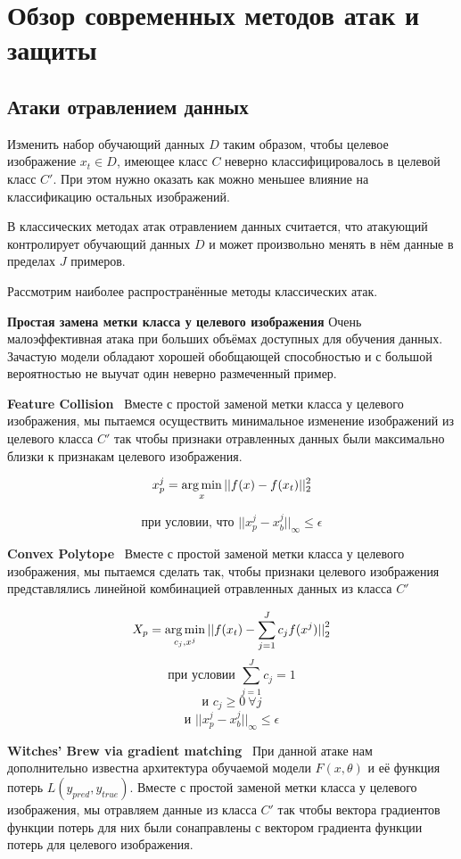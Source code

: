 \section*{Обзор современных методов атак и защиты}
\subsection*{Атаки отравлением данных}
Изменить набор обучающий данных $D$ таким образом, чтобы целевое изображение $x_t \in D$, имеющее класс $C$ неверно классифицировалось в целевой класс $C'$.
При этом нужно оказать как можно меньшее влияние на классификацию остальных изображений.

В классических методах атак отравлением данных считается, что атакующий контролирует обучающий данных $D$ и может произвольно менять в нём данные в пределах $J$ примеров.

Рассмотрим наиболее распространённые методы классических атак.

\textbf{Простая замена метки класса у целевого изображения}
Очень малоэффективная атака при больших объёмах доступных для обучения данных. Зачастую модели обладают хорошей обобщающей способностью и с большой вероятностью не выучат один неверно размеченный пример.

\textbf{Feature Collision}~\cite{schwarzschild_just_2021}
Вместе с простой заменой метки класса у целевого изображения, мы пытаемся осуществить минимальное изменение изображений из целевого класса $C'$ так чтобы признаки отравленных данных были максимально близки к признакам целевого изображения.

$$x^{j}_{p} = \operatorname*{arg\,min}_x ||f(x)-f(x_t)||_{2}^{2}$$

$$\text{при условии, что~} ||x_{p}^{j} - x_{b}^{j}||_{\infty} \leq \epsilon$$


\textbf{Convex Polytope}~\cite{schwarzschild_just_2021}
Вместе с простой заменой метки класса у целевого изображения, мы пытаемся сделать так, чтобы признаки целевого изображения представлялись линейной комбинацией отравленных данных из класса $C'$

$$X_p = \operatorname*{arg\,min}_{c_j, x^j} ||f(x_t) - \sum_{j=1}^{J} c_j f(x^j){||}_{2}^{2}$$
$$\text{при условии~} \sum_{j=1}^{J} c_j = 1$$
$$\text{и~} c_j \geq 0~\forall j$$
$$\text{и~} ||x_{p}^{j} - x_{b}^{j}||_{\infty} \leq \epsilon$$


\textbf{Witches' Brew via gradient matching}~\cite{geiping_witches_2021}
При данной атаке нам дополнительно известна архитектура обучаемой модели $F(x, \theta)$ и её функция потерь $L(y_{pred}, y_{true})$.
Вместе с простой заменой метки класса у целевого изображения, мы отравляем данные из класса $C'$ так чтобы вектора градиентов функции потерь для них были сонаправлены с вектором градиента функции потерь для целевого изображения.

